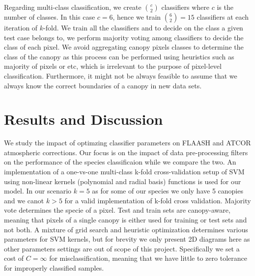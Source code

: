\documentclass[remotesensing,article,accept,moreauthors,pdftex,12pt,a4paper]{mdpi}
\begin{document}
Regarding multi-class classification, we create $\binom{c}{2}$ classifiers where $c$ is the number of classes. 
In this case $c=6$, hence we train $\binom{6}{2} = 15$ classifiers at each iteration of $k$-fold.
We train all the classifiers and to decide on the class a given test case belongs to, we perform majority voting among classifiers to decide the class of each pixel. 
We avoid aggregating canopy pixels classes to determine the class of the canopy as this process can be performed using heuristics such as majority of pixels or etc, which is irrelevant to the purpose of pixel-level classification.
Furthermore, it might not be always feasible to assume that we always know the correct boundaries of a canopy in new data sets.







\section{Results and Discussion}

We study the impact of optimzing classifier parameters on FLAASH and ATCOR atmospheric corrections. 
Our focus is on the impact of data pre-processing filters on the performance of the species classificaion while we compare the two. 
An implementation of a one-vs-one multi-class k-fold cross-validation setup of SVM using non-linear kernels (polynomial and radial basis) functions is used for our model. 
In our scenario $k=5$ as for some of our species we only have 5 canopies and we canot $k>5$ for a valid implementation of k-fold cross validation.
Majority vote determines the specie of a pixel. 
Test and train sets are canopy-aware, meaning that pixels of a single canopy is either used for training or test sets and not both.
A mixture of grid search and heuristic optimization determines various parameters for SVM kernels, but for brevity we only present 2D diagrams here as other parameters settings are out of scope of this project. 
Specifically we set a cost of $C = \infty$ for misclassification, meaning that we have little to zero tolerance for improperly classified samples.



\end{document}

